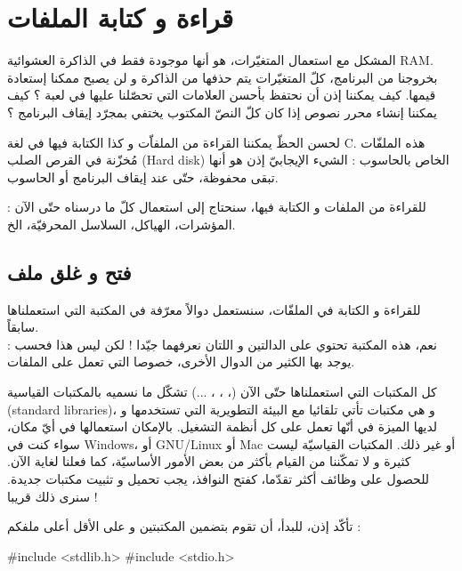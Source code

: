 \chapter{قراءة و كتابة الملفات}
المشكل مع استعمال المتغيّرات، هو أنها موجودة فقط في الذاكرة العشوائية
\textenglish{RAM}.
بخروجنا من البرنامج، كلّ المتغيّرات يتم حذفها من الذاكرة و لن يصبح ممكنا إستعادة قيمها. كيف يمكننا إذن أن نحتفظ بأحسن العلامات التي تحصّلنا عليها في لعبة ؟ كيف يمكننا إنشاء محرر نصوص إذا كان كلّ النصّ  المكتوب يختفي بمجرّد إيقاف البرنامج ؟

لحسن الحظّ يمكننا القراءة من الملفاّت و كذا الكتابة فيها في لغة
\textenglish{C}.
هذه الملفّات مُخزّنة في القرص الصلب
(\textenglish{Hard disk})
الخاص بالحاسوب : الشيء الإيجابيّ إذن هو أنها تبقى محفوظة، حتّى عند إيقاف البرنامج أو الحاسوب.

للقراءة من الملفات و الكتابة فيها، سنحتاج إلى استعمال كلّ ما درسناه حتّى الآن : المؤشرات، الهياكل، السلاسل المحرفيّة، الخ.

\section{فتح و غلق ملف}
للقراءة و الكتابة في الملفّات، سنستعمل دوالاً معرّفة في المكتبة
التي استعملناها سابقاً.\\
نعم، هذه المكتبة تحتوي على الدالتين
و
اللتان نعرفهما جيّدا ! لكن ليس هذا فحسب : يوجد بها الكثير من الدوال الأخرى، خصوصا التي تعمل على الملفات.

\begin{information}
  كل المكتبات التي استعملناها حتّى الآن
(، ، ، ...)
تشكّل ما نسميه بالمكتبات القياسية
(\textenglish{standard libraries})،
و هي مكتبات تأتي تلقائيا مع البيئة التطويرية التي تستخدمها و لديها الميزة في أنّها تعمل على كل أنظمة التشغيل. بالإمكان استعمالها في أيّ مكان، سواء كنت في
\textenglish{Windows}،
أو
\textenglish{GNU/Linux}
أو
\textenglish{Mac}
أو غير ذلك.
المكتبات القياسيّة ليست كثيرة و لا تمكّننا من القيام بأكثر من بعض الأمور الأساسيّة، كما فعلنا لغاية الآن. للحصول على وظائف أكثر تقدّما، كفتح النوافذ، يجب تحميل و تثبيت مكتبات جديدة. سنرى ذلك قريبا !
\end{information}

تأكّد إذن، للبدأ، أن تقوم بتضمين المكتبتين
و
على الأقل أعلى ملفكم
 :

\begin{Csource}
#include <stdlib.h>
#include <stdio.h>
\end{Csource}

